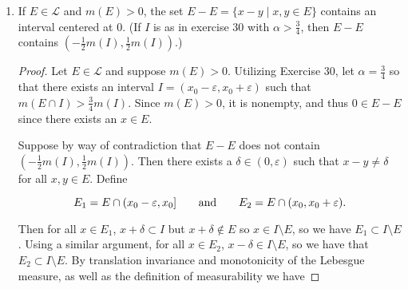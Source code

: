 \documentclass[11pt,oneside,english]{amsart}
\theoremstyle{definition}
\newcommand{\aspace}{\hspace{7mm}\text{and}\hspace{7mm}}
\newcommand{\ve}{\varepsilon}
\newcommand{\MC}[1]{\mathcal{#1}}
\begin{document}
\begin{enumerate}
\begin{proof}
\[
U=\bigsqcup_{j=1}^\infty I_j.
\]

Then by countable additivity, we have

\[
\alpha \sum_{j=1}^\infty m(I_j)=\alpha m(U)<m(E)=\sum_{j=1}^\infty m(I_j\cap E)
\]

Note that $(I_j\cap E)\subset I_j$ for each $j$, so by construction there must be a $\widehat{j}$ such that $\alpha m(I_{\widehat{j}})<m(I_{\widehat{j}}\cap E)$. Let $I=I_{\widehat{j}}$, and then we have $m(E\cap I)>\alpha m(I)$. 

\pagebreak
\textit{Case 2:} $m(E)=\infty$ and $0\leq \alpha <1$.

Choose an interval $J$ such that $m(J\cap E)<\infty$. Then by a construction similar to that above, we can find an open interval $I$ such that $\alpha m(I)<m((J\cap E)\cap I)<m(E\cap I)$ by monotonicity.

\textit{Case 3:} $m(E)<\infty$ or $m(E)=\infty$, and $\alpha <0$.

Since $m(E)>0$, by Theorem 1.18, we can find a compact set $K\subset E$ such that $m(K)>0$. Since $K$ is compact, $a=\min\{x\mid x\in K\}$ and $b=\max\{x\mid x\in K\}$ exist and are contained in $K$. Let $I=[a,b)$. Then  $E\cap I=I$ and thus

\[
m(E\cap I)=m(I)>0>\alpha m(I).
\]


\end{proof}



\item If $E\in \MC{L}$ and $m(E)>0$, the set $E-E=\{x-y\mid x,y\in E\}$ contains an interval centered at 0. (If $I$ is as in exercise 30 with $\alpha >\frac{3}{4}$, then $E-E$ contains $\left(-\frac{1}{2}m(I),\frac{1}{2}m(I)\right)$.)

\begin{proof}

Let $E\in \MC{L}$ and suppose $m(E)>0$. Utilizing Exercise 30, let $\alpha=\frac{3}{4}$ so that there exists an interval $I=(x_0-\ve,x_0+\ve)$ such that $m(E\cap I)>\frac{3}{4}m(I)$. Since $m(E)>0$, it is nonempty, and thus $0\in E-E$ since there exists an $x\in E$. 

Suppose by way of contradiction that $E-E$ does not contain $\left(-\frac{1}{2}m(I),\frac{1}{2}m(I)\right)$. Then there exists a $\delta\in (0,\ve)$ such that $x-y\neq \delta$ for all $x,y\in E$. Define

\[
E_1=E\cap (x_0-\ve, x_0]\aspace E_2=E\cap (x_0,x_0+\ve).
\]

Then for all $x\in E_1$, $x+\delta\subset I$ but $x+\delta \notin E$ so $x\in I\setminus E$, so we have $E_1\subset I\setminus E$. Using a similar argument, for all $x\in E_2$, $x-\delta\in I\setminus E$, so we have that $E_2\subset I\setminus E$. By translation invariance and monotonicity of the Lebesgue measure, as well as the definition of measurability we have


\end{proof}
\end{enumerate}
\end{document}
